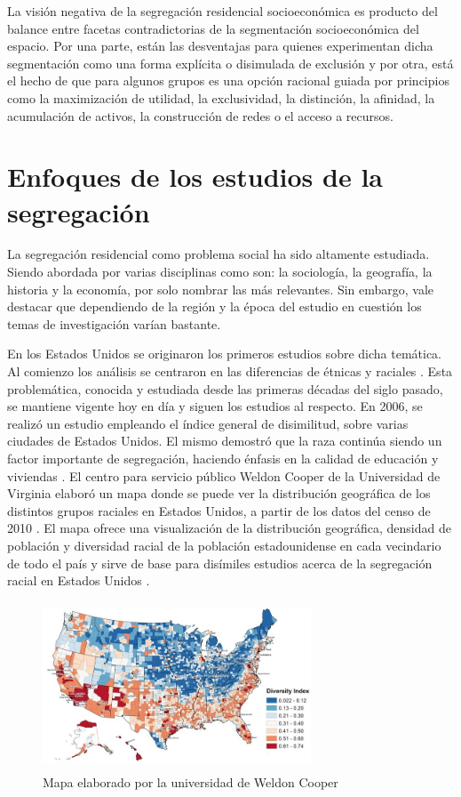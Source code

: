 La visión negativa de la segregación residencial socioeconómica es producto del balance entre facetas contradictorias de la segmentación socioeconómica del espacio. Por una parte, están las desventajas para quienes experimentan dicha segmentación como una forma explícita o disimulada de exclusión y por otra, está el hecho de que para algunos grupos es una opción racional guiada por principios como la maximización de utilidad, la exclusividad, la distinción, la afinidad, la acumulación de activos, la construcción de redes o el acceso a recursos.


\section{Enfoques de los estudios de la segregación} 

La segregación residencial como problema social ha sido altamente estudiada. Siendo abordada por varias disciplinas como son: la sociología, la geografía, la historia y la economía, por solo nombrar las más relevantes. Sin embargo, vale destacar que dependiendo de la región y la época del estudio en cuestión los temas de investigación varían bastante. 

En los Estados Unidos se originaron los primeros estudios sobre dicha temática. Al comienzo los análisis se centraron en las diferencias de étnicas y raciales \cite{Feitosa2004SpatialMO}. Esta problemática, conocida y estudiada desde las primeras décadas del siglo pasado, se mantiene vigente hoy en día y siguen los estudios al respecto. En 2006, se realizó un estudio empleando el índice general de disimilitud, sobre varias ciudades de Estados Unidos. El mismo demostró que la raza continúa siendo un factor importante de segregación, haciendo énfasis en la calidad de educación y viviendas \cite{Selmi2005RaceIT}. El centro para servicio público Weldon Cooper de la Universidad de Virginia elaboró un mapa donde se puede ver la distribución geográfica de los distintos grupos raciales en Estados Unidos, a partir de los datos del censo de 2010 \cite{SDC}. El mapa ofrece una visualización de la distribución geográfica, densidad de población y diversidad racial de la población estadounidense en cada vecindario de todo el país y sirve de base para disímiles estudios acerca de la segregación racial en Estados Unidos \cite{WC}.

\begin{figure}[htb]
	\centering
	\includegraphics[width=8cm, height=5cm]{Images/WeldomCooper.jpg} 
	\caption{Mapa elaborado por la universidad de Weldon Cooper }
\end{figure} 

